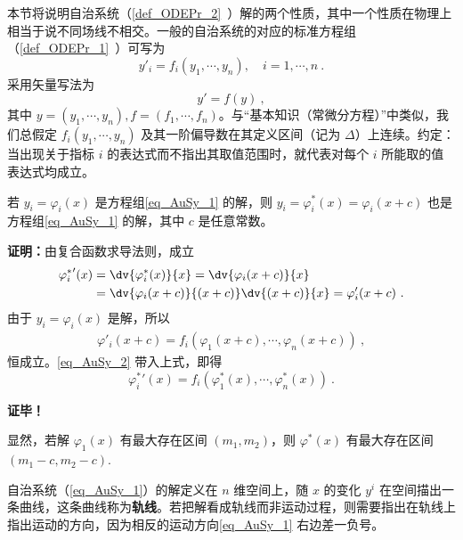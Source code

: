 
本节将说明自治系统（\autoref{def_ODEPr_2}~）解的两个性质，其中一个性质在物理上相当于说不同场线不相交。一般的自治系统的对应的标准方程组（\autoref{def_ODEPr_1}~）可写为
\begin{equation}\label{eq_AuSy_1}
y'_i=f_i(y_1,\cdots,y_n),\quad i=1,\cdots,n~.
\end{equation}
采用矢量写法为
\begin{equation}
y'=f(y)~,
\end{equation}
其中 $y=(y_1,\cdots,y_n),f=(f_1,\cdots,f_n)$。与“基本知识（常微分方程）”中类似，我们总假定 $f_i(y_1,\cdots,y_n)$ 及其一阶偏导数在其定义区间（记为 $\Delta$）上连续。约定：当出现关于指标 $i$ 的表达式而不指出其取值范围时，就代表对每个 $i$ 所能取的值表达式均成立。

\begin{theorem}{}\label{the_AuSy_1}
若 $y_i=\varphi_i(x)$ 是方程组\autoref{eq_AuSy_1} 的解，则 $y_i=\varphi^*_i(x)=\varphi_i(x+c)$ 也是方程组\autoref{eq_AuSy_1} 的解，其中 $c$ 是任意常数。
\end{theorem}
\textbf{证明：}由复合函数求导法则，成立
\begin{equation}\label{eq_AuSy_2}
\begin{aligned}
{\varphi^*_i}'(x)&=\dv{\varphi^*_i(x)}{x}=\dv{\varphi_i(x+c)}{x}\\
&=\dv{\varphi_i(x+c)}{(x+c)}\dv{(x+c)}{x}=\varphi'_i(x+c)~.
\end{aligned}
\end{equation}
由于 $y_i=\varphi_i(x)$ 是解，所以
\begin{equation}
\begin{aligned}
\varphi'_i(x+c)=f_i(\varphi_1(x+c),\cdots,\varphi_n(x+c))~,
\end{aligned}
\end{equation}
恒成立。\autoref{eq_AuSy_2} 带入上式，即得
\begin{equation}
{\varphi^*_i}'(x)=f_i(\varphi^*_1(x),\cdots,\varphi^*_n(x))~.
\end{equation}

\textbf{证毕！}

显然，若解 $\varphi_1(x)$ 有最大存在区间 $(m_1,m_2)$，则 $\varphi^*(x)$ 有最大存在区间 $(m_1-c,m_2-c)$.

自治系统（\autoref{eq_AuSy_1}）的解定义在 $n$ 维空间上，随 $x$ 的变化 $y^i$ 在空间描出一条曲线，这条曲线称为\textbf{轨线}。若把解看成轨线而非运动过程，则需要指出在轨线上指出运动的方向，因为相反的运动方向\autoref{eq_AuSy_1} 右边差一负号。

